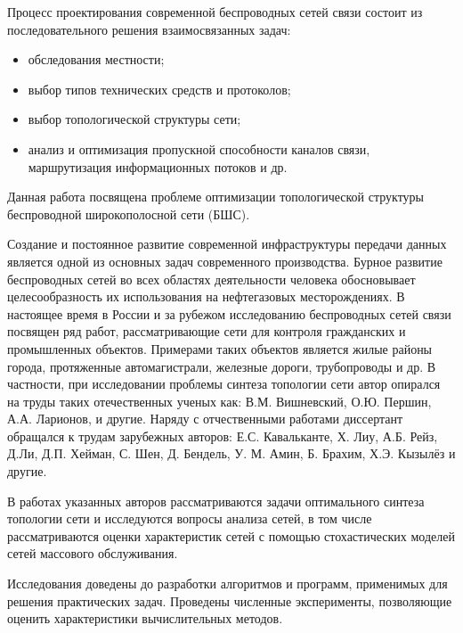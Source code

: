 Процесс проектирования современной  беспроводных сетей связи состоит из последовательного решения взаимосвязанных задач:

\begin{itemize}
    \item обследования местности;
    \item выбор типов технических средств и протоколов;
    \item выбор топологической структуры сети;
    \item анализ и оптимизация пропускной способности каналов связи, маршрутизация информационных потоков и др.
\end{itemize}

Данная работа посвящена проблеме оптимизации топологической структуры беспроводной широкополосной сети (БШС).


{\progress} Создание и постоянное развитие современной инфраструктуры передачи данных является одной из основных задач современного производства. Бурное развитие беспроводных сетей во всех областях деятельности человека обосновывает целесообразность их использования на нефтегазовых месторождениях. В настоящее время в России и за рубежом исследованию беспроводных сетей связи посвящен ряд работ, рассматривающие сети для контроля гражданских  и промышленных объектов. Примерами таких объектов является жилые районы города, протяженные автомагистрали, железные дороги, трубопроводы и др. В частности, при исследовании проблемы синтеза топологии сети автор опирался на труды таких отечественных ученых как: В.М. Вишневский, О.Ю. Першин, А.А. Ларионов, и другие.
Наряду с отчественными работами диссертант обращался к трудам зарубежных авторов: Е.С. Кавальканте, Х. Лиу, А.Б. Рейз, Д.Ли, Д.П. Хейман, С. Шен, Д. Бендель, У. М. Амин, Б. Брахим, Х.Э. Кызылёз и другие. 

В работах указанных авторов рассматриваются задачи оптимального синтеза топологии сети и исследуются вопросы анализа сетей, в том числе рассматриваются оценки характеристик сетей с помощью стохастических моделей сетей массового обслуживания. 

Исследования доведены до разработки алгоритмов и программ, применимых для решения практических задач. Проведены численные эксперименты, позволяющие оценить характеристики вычислительных методов.


